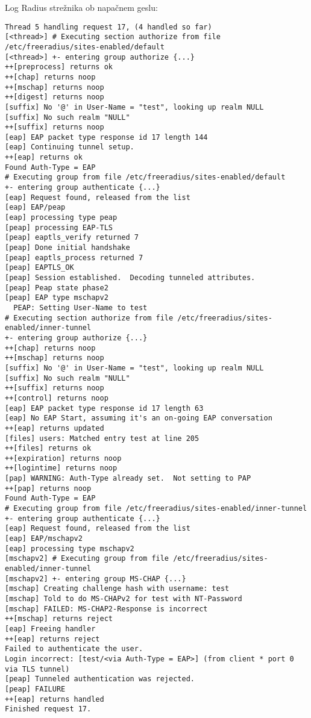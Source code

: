 \documentclass[12pt]{article}
\begin{document}
Log Radius strežnika ob napačnem geslu:

\begin{verbatim}
Thread 5 handling request 17, (4 handled so far)
[<thread>] # Executing section authorize from file /etc/freeradius/sites-enabled/default
[<thread>] +- entering group authorize {...}
++[preprocess] returns ok
++[chap] returns noop
++[mschap] returns noop
++[digest] returns noop
[suffix] No '@' in User-Name = "test", looking up realm NULL
[suffix] No such realm "NULL"
++[suffix] returns noop
[eap] EAP packet type response id 17 length 144
[eap] Continuing tunnel setup.
++[eap] returns ok
Found Auth-Type = EAP
# Executing group from file /etc/freeradius/sites-enabled/default
+- entering group authenticate {...}
[eap] Request found, released from the list
[eap] EAP/peap
[eap] processing type peap
[peap] processing EAP-TLS
[peap] eaptls_verify returned 7 
[peap] Done initial handshake
[peap] eaptls_process returned 7 
[peap] EAPTLS_OK
[peap] Session established.  Decoding tunneled attributes.
[peap] Peap state phase2
[peap] EAP type mschapv2
  PEAP: Setting User-Name to test
# Executing section authorize from file /etc/freeradius/sites-enabled/inner-tunnel
+- entering group authorize {...}
++[chap] returns noop
++[mschap] returns noop
[suffix] No '@' in User-Name = "test", looking up realm NULL
[suffix] No such realm "NULL"
++[suffix] returns noop
++[control] returns noop
[eap] EAP packet type response id 17 length 63
[eap] No EAP Start, assuming it's an on-going EAP conversation
++[eap] returns updated
[files] users: Matched entry test at line 205
++[files] returns ok
++[expiration] returns noop
++[logintime] returns noop
[pap] WARNING: Auth-Type already set.  Not setting to PAP
++[pap] returns noop
Found Auth-Type = EAP
# Executing group from file /etc/freeradius/sites-enabled/inner-tunnel
+- entering group authenticate {...}
[eap] Request found, released from the list
[eap] EAP/mschapv2
[eap] processing type mschapv2
[mschapv2] # Executing group from file /etc/freeradius/sites-enabled/inner-tunnel
[mschapv2] +- entering group MS-CHAP {...}
[mschap] Creating challenge hash with username: test
[mschap] Told to do MS-CHAPv2 for test with NT-Password
[mschap] FAILED: MS-CHAP2-Response is incorrect
++[mschap] returns reject
[eap] Freeing handler
++[eap] returns reject
Failed to authenticate the user.
Login incorrect: [test/<via Auth-Type = EAP>] (from client * port 0 via TLS tunnel)
[peap] Tunneled authentication was rejected.
[peap] FAILURE
++[eap] returns handled
Finished request 17.
\end{verbatim}
\end{document}
